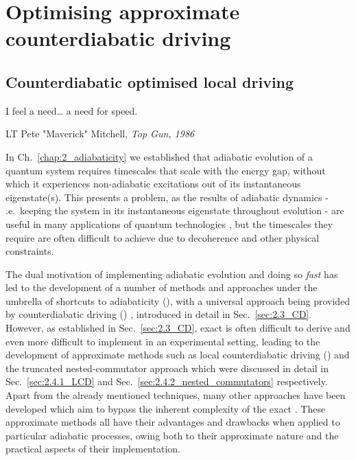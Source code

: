 \part{Optimising approximate counterdiabatic driving}

\chapter{Counterdiabatic optimised local driving}\label{chap:4_COLD}

\epigraph{I feel a need… a need for speed.}{LT Pete "Maverick" Mitchell, \emph{Top Gun, 1986}}

In Ch.~\ref{chap:2_adiabaticity} we established that adiabatic evolution of a quantum system requires timescales that scale with the energy gap, without which it experiences non-adiabatic excitations out of its instantaneous eigenstate(s). This presents a problem, as the results of adiabatic dynamics - \@i.e.~keeping the system in its instantaneous eigenstate throughout evolution - are useful in many applications of quantum technologies \cite{dimitrova_many-body_2023, campo_more_2014, ebadi_quantum_2022}, but the timescales they require are often difficult to achieve due to decoherence and other physical constraints. 

The dual motivation of implementing adiabatic evolution and doing so \emph{fast} has led to the development of a number of methods and approaches under the umbrella of shortcuts to adiabaticity ()\cite{guery-odelin_shortcuts_2019}, with a universal  approach being provided by counterdiabatic driving () \cite{berry_transitionless_2009, demirplak_adiabatic_2003}, introduced in detail in Sec.~\ref{sec:2.3_CD}. However, as established in Sec.~\ref{sec:2.3_CD}, exact  is often difficult to derive and even more difficult to implement in an experimental setting, leading to the development of approximate methods such as local counterdiabatic driving \cite{sels_minimizing_2017} () and the truncated nested-commutator approach \cite{claeys_floquet-engineering_2019} which were discussed in detail in Sec.~\ref{sec:2.4.1_LCD} and Sec.~\ref{sec:2.4.2_nested_commutators} respectively. Apart from the already mentioned techniques, many other approaches \cite{saberi_adiabatic_2014, campbell_shortcut_2015, whitty_quantum_2020} have been developed which aim to bypass the inherent complexity of the exact . These approximate methods all have their advantages and drawbacks when applied to particular adiabatic processes, owing both to their approximate nature and the practical aspects of their implementation.  

